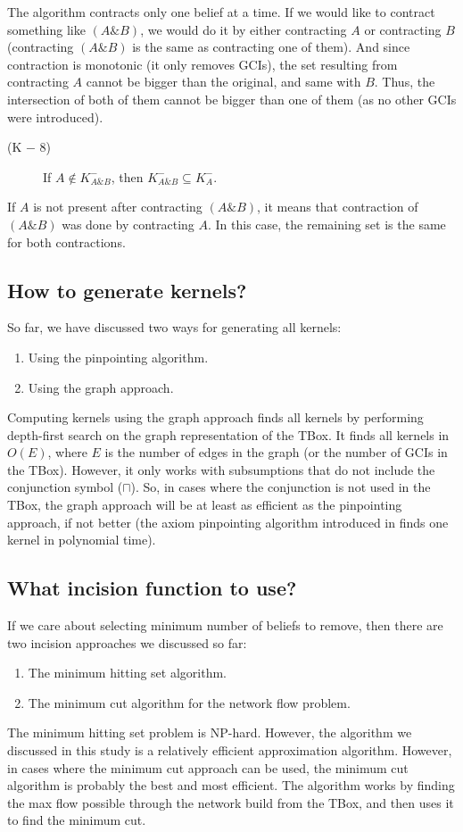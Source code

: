 \documentclass{sfuthesis}
\theoremstyle{plain}
\theoremstyle{definition}
\begin{document}
The algorithm contracts only one belief at a time. If we would like to contract something like $(A \& B)$, we would do it by either contracting $A$ or contracting $B$ (contracting $(A \& B)$ is the same as contracting one of them). And since contraction is monotonic (it only removes GCIs), the set resulting from contracting $A$ cannot be bigger than the original, and same with $B$. Thus, the intersection of both of them cannot be bigger than one of them (as no other GCIs were introduced).
\begin{description}
\item[(K $-$ 8)] If $A \notin K^{-}_{A \& B}$, then $K^{-}_{A \& B} \subseteq K^{-}_{A}$.
\end{description}
If $A$ is not present after contracting $(A \& B)$, it means that contraction of $(A \& B)$ was done by contracting $A$. In this case, the remaining set is the same for both contractions.

\subsection{How to generate kernels?}
So far, we have discussed two ways for generating all kernels:
\begin{enumerate}
\item Using the pinpointing algorithm.
\item Using the graph approach.
\end{enumerate}
Computing kernels using the graph approach finds all kernels by performing depth-first search on the graph representation of the TBox. It finds all kernels in $O(E)$, where $E$ is the number of edges in the graph (or the number of GCIs in the TBox). However, it only works with subsumptions that do not include the conjunction symbol ($\sqcap$). So, in cases where the conjunction is not used in the TBox, the graph approach will be at least as efficient as the pinpointing approach, if not better (the axiom pinpointing algorithm introduced in \cite{pin} finds one kernel in polynomial time).


\subsection{What incision function to use?}
If we care about selecting minimum number of beliefs to remove, then there are two incision approaches we discussed so far:
\begin{enumerate}
\item The minimum hitting set algorithm.
\item The minimum cut algorithm for the network flow problem.
\end{enumerate}
The minimum hitting set problem is NP-hard. However, the algorithm we discussed in this study is a relatively efficient approximation algorithm. However, in cases where the minimum cut approach can be used, the minimum cut algorithm is probably the best and most efficient. The algorithm works by finding the max flow possible through the network build from the TBox, and then uses it to find the minimum cut.
\end{document}
